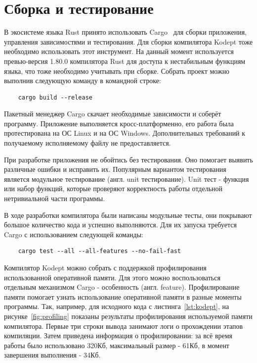 \chapter{Сборка и тестирование}
\label{ch:chap4_soft_testing}

В экосистеме языка Rust принято использовать Cargo~\cite{CargoBook} для сборки приложения, управления зависимостями и тестирования.
Для сборки компилятора Kodept тоже необходимо использовать этот инструмент.
На данный момент используется превью-версия 1.80.0 компилятора Rust для доступа к нестабильным функциям языка, что тоже необходимо учитывать при сборке.
Собрать проект можно выполнив следующую команду в командной строке:

\begin{verbatim}
    cargo build --release
\end{verbatim}

Пакетный менеджер Cargo скачает необходимые зависимости и соберёт программу.
Приложение выполняется кросс-платформенно, его работа была протестирована на ОС Linux и на ОС Windows.
Дополнительных требований к получаемому исполняемому файлу не предоставляется.

При разработке приложения не обойтись без тестирования.
Оно помогает выявить различные ошибки и исправить их.
Популярным вариантом тестирования является модульное тестирование (англ. unit тестирование).
Unit тест - функция или набор функций, которые проверяют корректность работы отдельной нетривиальной части программы.

В ходе разработки компилятора были написаны модульные тесты, они покрывают большое количество кода и успешно выполняются.
Для их запуска требуется Cargo с использованием следующей команды:

\begin{verbatim}
    cargo test --all --all-features --no-fail-fast
\end{verbatim}

Компилятор Kodept можно собрать с поддержкой профилирования использованной оперативной памяти.
Для этого можно воспользоваться отдельным механизмом Cargo - особенность (англ. feature).
Профилирование памяти помогает узнать использование оперативной памяти в разные моменты программы.
Так, например, для исходного кода с листинга~\ref{lst:kodept}, на рисунке~\ref{fig:profiling} показаны результаты профилирования используемой памяти компилятора.
Первые три строки вывода занимают логи о прохождении этапов компиляции.
Затем приведена информация о профилировании: за всё время работы было использовано 320Кб, максимальный размер - 61Кб, в момент завершения выполнения - 34Кб.

